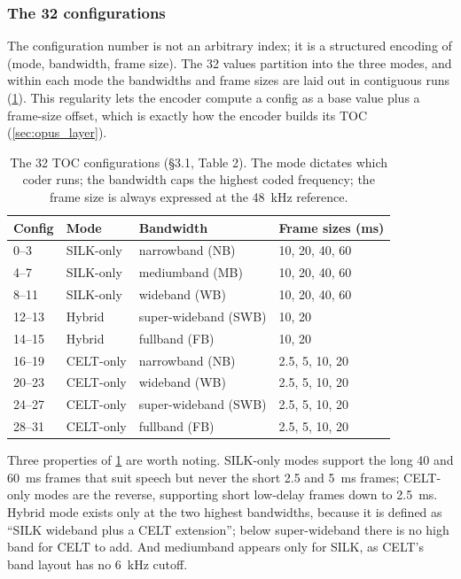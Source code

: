 \subsubsection{The 32 configurations}

The configuration number is not an arbitrary index; it is a structured encoding
of (mode, bandwidth, frame size). The 32 values partition into the three modes,
and within each mode the bandwidths and frame sizes are laid out in contiguous
runs (\cref{tab:configs}). This regularity lets the encoder compute a config as
a base value plus a frame-size offset, which is exactly how the encoder builds
its TOC (\cref{sec:opus_layer}).

\begin{table}[h]
  \centering
  \begin{tabular}{llll}
    \toprule
    \textbf{Config} & \textbf{Mode} & \textbf{Bandwidth} &
    \textbf{Frame sizes (ms)} \\
    \midrule
    0--3   & SILK-only & narrowband (NB)      & 10, 20, 40, 60 \\
    4--7   & SILK-only & mediumband (MB)      & 10, 20, 40, 60 \\
    8--11  & SILK-only & wideband (WB)        & 10, 20, 40, 60 \\
    12--13 & Hybrid    & super-wideband (SWB) & 10, 20 \\
    14--15 & Hybrid    & fullband (FB)        & 10, 20 \\
    16--19 & CELT-only & narrowband (NB)      & 2.5, 5, 10, 20 \\
    20--23 & CELT-only & wideband (WB)        & 2.5, 5, 10, 20 \\
    24--27 & CELT-only & super-wideband (SWB) & 2.5, 5, 10, 20 \\
    28--31 & CELT-only & fullband (FB)        & 2.5, 5, 10, 20 \\
    \bottomrule
  \end{tabular}
  \caption{The 32 TOC configurations (\S3.1, Table 2). The mode dictates which
    coder runs; the bandwidth caps the highest coded frequency; the
    frame size is
  always expressed at the 48~kHz reference.}
  \label{tab:configs}
\end{table}

Three properties of \cref{tab:configs} are worth noting. SILK-only modes support
the long 40 and 60~ms frames that suit speech but never the short 2.5 and 5~ms
frames; CELT-only modes are the reverse, supporting short low-delay frames down
to 2.5~ms. Hybrid mode exists only at the two highest bandwidths, because it is
defined as ``SILK wideband plus a CELT extension''; below super-wideband there
is no high band for CELT to add. And mediumband appears only for SILK, as CELT's
band layout has no 6~kHz cutoff.

